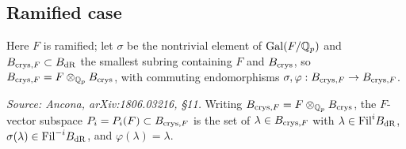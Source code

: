 \subsection*{Ramified case}

Here \(F\) is ramified; let \(\sigma\) be the nontrivial element of
\(\mathrm{Gal}(F/\mathbb{Q}_p)\) and \(B_{\mathrm{crys},F} \subset B_{\mathrm{dR}}\) the smallest subring
containing \(F\) and \(B_{\mathrm{crys}}\), so \(B_{\mathrm{crys},F} = F \otimes_{\mathbb{Q}_p} B_{\mathrm{crys}}\),
with commuting endomorphisms \(\sigma, \varphi : B_{\mathrm{crys},F} \to B_{\mathrm{crys},F}\).

\begin{definition}
  \label{def:periods-ram}
  \textit{Source: Ancona, arXiv:1806.03216, \S11.}
  Writing \(B_{\mathrm{crys},F} = F \otimes_{\mathbb{Q}_p} B_{\mathrm{crys}}\), the \(F\)-vector subspace
  \(P_i = P_i(F) \subset B_{\mathrm{crys},F}\) is the set of \(\lambda \in B_{\mathrm{crys},F}\)
  with \(\lambda \in \mathrm{Fil}^i B_{\mathrm{dR}}\), \(\sigma(\lambda) \in \mathrm{Fil}^{-i} B_{\mathrm{dR}}\), and
  \(\varphi(\lambda) = \lambda\).
\end{definition}

